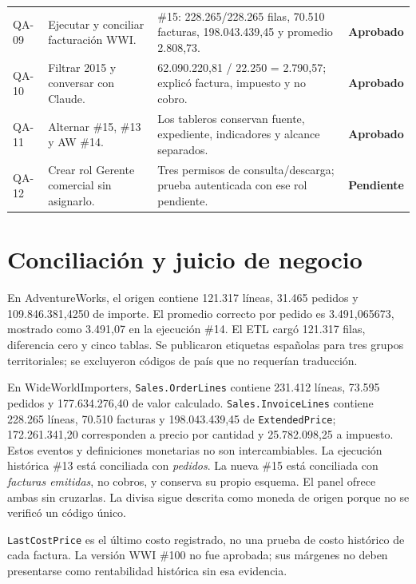 \documentclass[10pt,letterpaper]{article}
\newcommand{\ok}{\textcolor{verde}{\textbf{Aprobado}}}
\newcommand{\pending}{\textcolor{rojo}{\textbf{Pendiente}}}
\begin{document}
\begin{longtable}{@{}p{}p{}p{}p{}@{}}
QA-09 & Ejecutar y conciliar facturación WWI. & \#15: 228.265/228.265 filas, 70.510 facturas, 198.043.439,45 y promedio 2.808,73. & \ok\\
QA-10 & Filtrar 2015 y conversar con Claude. & 62.090.220,81 / 22.250 = 2.790,57; explicó factura, impuesto y no cobro. & \ok\\
QA-11 & Alternar \#15, \#13 y AW \#14. & Los tableros conservan fuente, expediente, indicadores y alcance separados. & \ok\\
QA-12 & Crear rol Gerente comercial sin asignarlo. & Tres permisos de consulta/descarga; prueba autenticada con ese rol pendiente. & \pending\\
\bottomrule\end{longtable}
\normalsize

\section{Conciliación y juicio de negocio}
En AdventureWorks, el origen contiene 121.317 líneas, 31.465 pedidos y 109.846.381,4250 de importe. El promedio correcto por pedido es 3.491,065673, mostrado como 3.491,07 en la ejecución \#14. El ETL cargó 121.317 filas, diferencia cero y cinco tablas. Se publicaron etiquetas españolas para tres grupos territoriales; se excluyeron códigos de país que no requerían traducción.

En WideWorldImporters, \texttt{Sales.OrderLines} contiene 231.412 líneas, 73.595 pedidos y 177.634.276,40 de valor calculado. \texttt{Sales.InvoiceLines} contiene 228.265 líneas, 70.510 facturas y 198.043.439,45 de \texttt{ExtendedPrice}; 172.261.341,20 corresponden a precio por cantidad y 25.782.098,25 a impuesto. Estos eventos y definiciones monetarias no son intercambiables. La ejecución histórica \#13 está conciliada con \emph{pedidos}. La nueva \#15 está conciliada con \emph{facturas emitidas}, no cobros, y conserva su propio esquema. El panel ofrece ambas sin cruzarlas. La divisa sigue descrita como moneda de origen porque no se verificó un código único.

\texttt{LastCostPrice} es el último costo registrado, no una prueba de costo histórico de cada factura. La versión WWI \#100 no fue aprobada; sus márgenes no deben presentarse como rentabilidad histórica sin esa evidencia.
\end{document}
